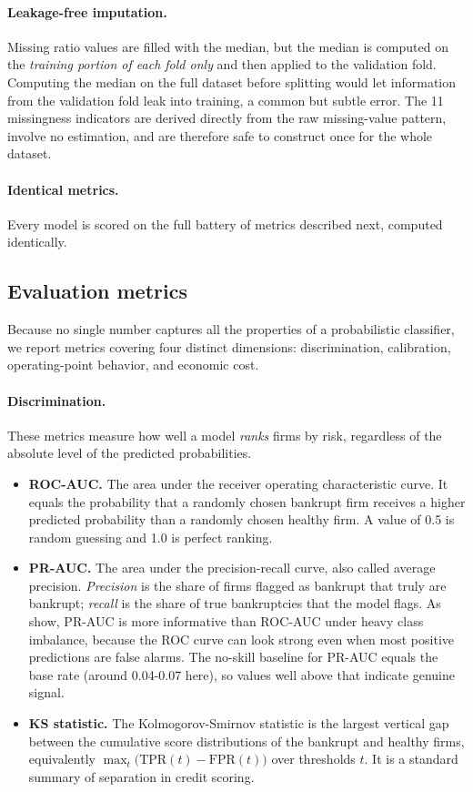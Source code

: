 \documentclass[12pt,a4paper]{article}
\begin{document}
\paragraph{Leakage-free imputation.} Missing ratio values are filled with the
median, but the median is computed on the \emph{training portion of each fold
only} and then applied to the validation fold. Computing the median on the
full dataset before splitting would let information from the validation fold
leak into training, a common but subtle error. The 11 missingness indicators
are derived directly from the raw missing-value pattern, involve no
estimation, and are therefore safe to construct once for the whole dataset.

\paragraph{Identical metrics.} Every model is scored on the full battery of
metrics described next, computed identically.

\subsection{Evaluation metrics}

Because no single number captures all the properties of a probabilistic
classifier, we report metrics covering four distinct dimensions:
discrimination, calibration, operating-point behavior, and economic cost.

\paragraph{Discrimination.} These metrics measure how well a model
\emph{ranks} firms by risk, regardless of the absolute level of the predicted
probabilities.
\begin{itemize}
\item \textbf{ROC-AUC.} The area under the receiver operating characteristic
curve. It equals the probability that a randomly chosen bankrupt firm
receives a higher predicted probability than a randomly chosen healthy firm.
A value of 0.5 is random guessing and 1.0 is perfect ranking.

\item \textbf{PR-AUC.} The area under the precision-recall curve, also called
average precision. \emph{Precision} is the share of firms flagged as bankrupt
that truly are bankrupt; \emph{recall} is the share of true bankruptcies that
the model flags. As \cite{saito2015} show, PR-AUC is more informative than
ROC-AUC under heavy class imbalance, because the ROC curve can look strong
even when most positive predictions are false alarms. The no-skill baseline
for PR-AUC equals the base rate (around 0.04-0.07 here), so values well above
that indicate genuine signal.

\item \textbf{KS statistic.} The Kolmogorov-Smirnov statistic is the largest
vertical gap between the cumulative score distributions of the bankrupt and
healthy firms, equivalently $\max_t \big(\text{TPR}(t) - \text{FPR}(t)\big)$
over thresholds $t$. It is a standard summary of separation in credit scoring.
\end{itemize}
\end{document}
